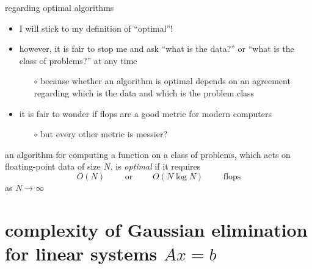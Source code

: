 \documentclass[10pt,
               svgnames,
               hyperref={colorlinks,citecolor=DeepPink4,linkcolor=FireBrick,urlcolor=Maroon},
               usepdftitle=false]{beamer}
\newcommand{\optimaldef}{
\begin{definition}
an algorithm for computing a function on a class of problems, which acts on floating-point data of size $N$, is \emph{optimal} if it requires
   $$O(N) \qquad \text{ or } \qquad O(N\log N) \qquad \text{ flops}$$
as $N\to\infty$
\end{definition}
}
\begin{document}
\begin{frame}{regarding optimal algorithms}

\begin{itemize}
\item I will stick to my definition of ``optimal''!
\item however, it is fair to stop me and ask ``what is the data?'' or ``what is the class of problems?'' at any time
    \begin{itemize}
    \item[$\circ$] because whether an algorithm is optimal depends on an agreement regarding which is the data and which is the problem class
    \end{itemize}
\item<2-> it is fair to wonder if flops are a good metric for modern computers
    \begin{itemize}
    \item[$\circ$] but every other metric is messier?
    \end{itemize}
\end{itemize}

\optimaldef
\end{frame}



\section{complexity of Gaussian elimination for linear systems $Ax=b$}
\end{document}
